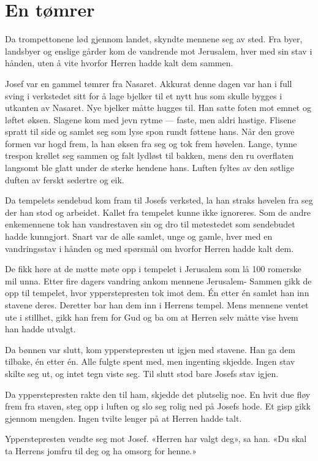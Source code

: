 \chapter{En tømrer}

Da trompettonene lød gjennom landet,
skyndte mennene seg av sted. Fra byer, landsbyer og
enslige gårder kom de vandrende mot Jerusalem,
hver med sin stav i hånden, uten å vite hvorfor
Herren hadde kalt dem sammen.

Josef var en gammel tømrer fra Nasaret. Akkurat denne dagen var
han i full sving i verkstedet sitt for å lage bjelker til
et nytt hus som skulle bygges i utkanten av
Nasaret. Nye bjelker måtte hugges til.
Han satte foten mot emnet og løftet øksen.
Slagene kom med jevn rytme --- faste, men aldri hastige.
Flisene spratt til side og samlet seg som lyse spon rundt føttene hans.
Når den grove formen var hogd frem, la han øksen fra seg og
tok frem høvelen. Lange, tynne trespon krøllet
seg sammen og falt lydløst til bakken,
mens den ru overflaten langsomt ble glatt
under de sterke hendene hans.
Luften fyltes av den søtlige duften av ferskt sedertre og eik.


Da tempelets sendebud kom fram til  Josefs verksted, 
la han straks høvelen fra seg der han stod og arbeidet.
Kallet fra tempelet kunne ikke ignoreres. Som de andre enkemennene
tok han vandrestaven sin og dro til møtestedet som sendebudet hadde kunngjort.
Snart var de alle samlet, unge og gamle, hver med en
vandringsstav i hånden og med spørsmål om hvorfor Herren hadde kalt dem.

De fikk høre at de møtte møte opp i tempelet i Jerusalem som
lå 100 romerske mil unna.  Etter fire dagers vandring ankom mennene Jerusalem-
Sammen gikk de opp til tempelet, hvor ypperstepresten tok imot dem.
Én etter én samlet han inn stavene deres.
Deretter bar han dem inn i Herrens tempel.
Mens mennene ventet ute i stillhet, gikk han frem for Gud og
ba om at Herren selv måtte vise hvem han hadde utvalgt.

Da bønnen var slutt, kom ypperstepresten ut igjen med stavene.
Han ga dem tilbake, én etter én. Alle fulgte spent med,
men ingenting skjedde. Ingen stav skilte seg ut, og intet tegn viste seg.
Til slutt stod bare Josefs stav igjen.

Da ypperstepresten rakte den til ham, skjedde det plutselig noe.
En hvit due fløy frem fra staven, steg opp i luften og
slo seg rolig ned på Josefs hode. Et gisp gikk gjennom mengden.
Ingen tvilte lenger på at Herren hadde talt.

Ypperstepresten vendte seg mot Josef.
«Herren har valgt deg», sa han.
«Du skal ta Herrens jomfru til deg og ha omsorg for henne.»

